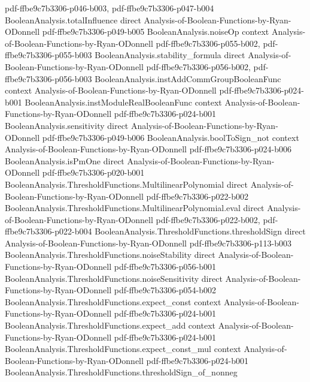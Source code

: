 \begin{theorem}
  {pdf-ffbe9c7b3306-p046-b003,
    pdf-ffbe9c7b3306-p047-b004}
\proofstep
  {BooleanAnalysis.totalInfluence}
  {direct}
  {Analysis-of-Boolean-Functions-by-Ryan-ODonnell}
  {pdf-ffbe9c7b3306-p049-b005}
\proofstep
  {BooleanAnalysis.noiseOp}
  {context}
  {Analysis-of-Boolean-Functions-by-Ryan-ODonnell}
  {pdf-ffbe9c7b3306-p055-b002,
    pdf-ffbe9c7b3306-p055-b003}
\proofstep
  {BooleanAnalysis.stability_formula}
  {direct}
  {Analysis-of-Boolean-Functions-by-Ryan-ODonnell}
  {pdf-ffbe9c7b3306-p056-b002,
    pdf-ffbe9c7b3306-p056-b003}
\proofstep
  {BooleanAnalysis.instAddCommGroupBooleanFunc}
  {context}
  {Analysis-of-Boolean-Functions-by-Ryan-ODonnell}
  {pdf-ffbe9c7b3306-p024-b001}
\proofstep
  {BooleanAnalysis.instModuleRealBooleanFunc}
  {context}
  {Analysis-of-Boolean-Functions-by-Ryan-ODonnell}
  {pdf-ffbe9c7b3306-p024-b001}
\proofstep
  {BooleanAnalysis.sensitivity}
  {direct}
  {Analysis-of-Boolean-Functions-by-Ryan-ODonnell}
  {pdf-ffbe9c7b3306-p049-b006}
\proofstep
  {BooleanAnalysis.boolToSign_not}
  {context}
  {Analysis-of-Boolean-Functions-by-Ryan-ODonnell}
  {pdf-ffbe9c7b3306-p024-b006}
\proofstep
  {BooleanAnalysis.isPmOne}
  {direct}
  {Analysis-of-Boolean-Functions-by-Ryan-ODonnell}
  {pdf-ffbe9c7b3306-p020-b001}
\proofstep
  {BooleanAnalysis.ThresholdFunctions.MultilinearPolynomial}
  {direct}
  {Analysis-of-Boolean-Functions-by-Ryan-ODonnell}
  {pdf-ffbe9c7b3306-p022-b002}
\proofstep
  {BooleanAnalysis.ThresholdFunctions.MultilinearPolynomial.eval}
  {direct}
  {Analysis-of-Boolean-Functions-by-Ryan-ODonnell}
  {pdf-ffbe9c7b3306-p022-b002,
    pdf-ffbe9c7b3306-p022-b004}
\proofstep
  {BooleanAnalysis.ThresholdFunctions.thresholdSign}
  {direct}
  {Analysis-of-Boolean-Functions-by-Ryan-ODonnell}
  {pdf-ffbe9c7b3306-p113-b003}
\proofstep
  {BooleanAnalysis.ThresholdFunctions.noiseStability}
  {direct}
  {Analysis-of-Boolean-Functions-by-Ryan-ODonnell}
  {pdf-ffbe9c7b3306-p056-b001}
\proofstep
  {BooleanAnalysis.ThresholdFunctions.noiseSensitivity}
  {direct}
  {Analysis-of-Boolean-Functions-by-Ryan-ODonnell}
  {pdf-ffbe9c7b3306-p054-b002}
\proofstep
  {BooleanAnalysis.ThresholdFunctions.expect_const}
  {context}
  {Analysis-of-Boolean-Functions-by-Ryan-ODonnell}
  {pdf-ffbe9c7b3306-p024-b001}
\proofstep
  {BooleanAnalysis.ThresholdFunctions.expect_add}
  {context}
  {Analysis-of-Boolean-Functions-by-Ryan-ODonnell}
  {pdf-ffbe9c7b3306-p024-b001}
\proofstep
  {BooleanAnalysis.ThresholdFunctions.expect_const_mul}
  {context}
  {Analysis-of-Boolean-Functions-by-Ryan-ODonnell}
  {pdf-ffbe9c7b3306-p024-b001}
\proofstep
  {BooleanAnalysis.ThresholdFunctions.thresholdSign_of_nonneg}

\end{theorem}
